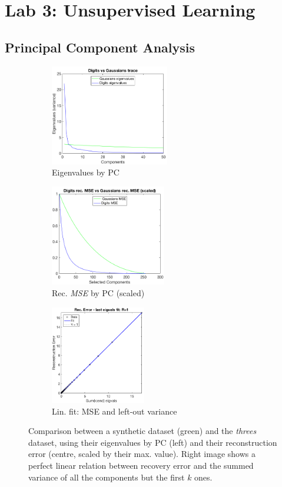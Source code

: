 \documentclass[a4paper, 10pt]{article}
\begin{document}
  \newpage
\section{Lab 3: Unsupervised Learning}
  \subsection{Principal Component Analysis}
  \begin{figure}[h]
    \begin{adjustwidth}{-1cm}{-1cm}
    \centering
    \begin{subfigure}[t]{0.3\linewidth}
      \includegraphics[width=1\linewidth, height=4.4cm]{./lab3/PCA/digits_vs_random_trace.png}
      \caption{Eigenvalues by PC}
      \label{fig:l3_traces}
    \end{subfigure}
    \begin{subfigure}[t]{0.29\linewidth}
      \includegraphics[width=1\linewidth, height=4.4cm]{./lab3/PCA/digits_vs_random_recMSE.png}
      \caption{Rec. \emph{MSE} by PC (scaled)}
      \label{fig:l3_rec_MSE}
    \end{subfigure}
    \begin{subfigure}[t]{0.3\linewidth}
      \includegraphics[width=1\linewidth, height=4.3cm]{./lab3/PCA/regression.png}
      \caption{Lin. fit: MSE and left-out variance}
      \label{fig:l3_regression}
    \end{subfigure}
    \end{adjustwidth}
    \caption{Comparison between a synthetic dataset (green) and the 
      \emph{threes} dataset, using their eigenvalues by PC (left) and their
      reconstruction error (centre, scaled by their max. value).
      Right image shows a perfect linear relation between recovery error and
      the summed variance of all the components but the first $k$ ones.}
    \label{fig:l3_first_task}
  \end{figure}
\end{document}

